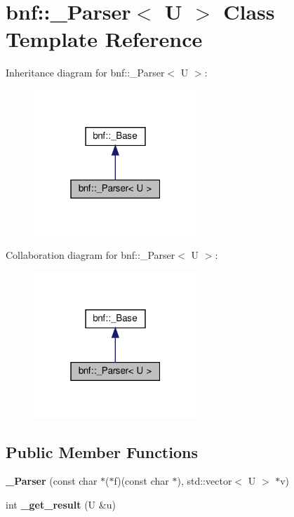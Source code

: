 \section{bnf\+:\+:\+\_\+\+Parser$<$ U $>$ Class Template Reference}
\label{classbnf_1_1___parser}


Inheritance diagram for bnf\+:\+:\+\_\+\+Parser$<$ U $>$\+:
\nopagebreak
\begin{figure}[H]
\begin{center}
\leavevmode
\includegraphics[width=175pt]{classbnf_1_1___parser__inherit__graph}
\end{center}
\end{figure}


Collaboration diagram for bnf\+:\+:\+\_\+\+Parser$<$ U $>$\+:
\nopagebreak
\begin{figure}[H]
\begin{center}
\leavevmode
\includegraphics[width=175pt]{classbnf_1_1___parser__coll__graph}
\end{center}
\end{figure}
\subsection*{Public Member Functions}
\begin{DoxyCompactItemize}
\item 
\mbox{\label{classbnf_1_1___parser_ac57c83f59cec66d464ddbafd3b9b1347}} 
{\bfseries \+\_\+\+Parser} (const char $\ast$($\ast$f)(const char $\ast$), std\+::vector$<$ U $>$ $\ast$v)
\item 
\mbox{\label{classbnf_1_1___parser_a7b311aedf21877c4b11d13ac5c31a047}} 
int {\bfseries \+\_\+get\+\_\+result} (U \&u)
\end{DoxyCompactItemize}
